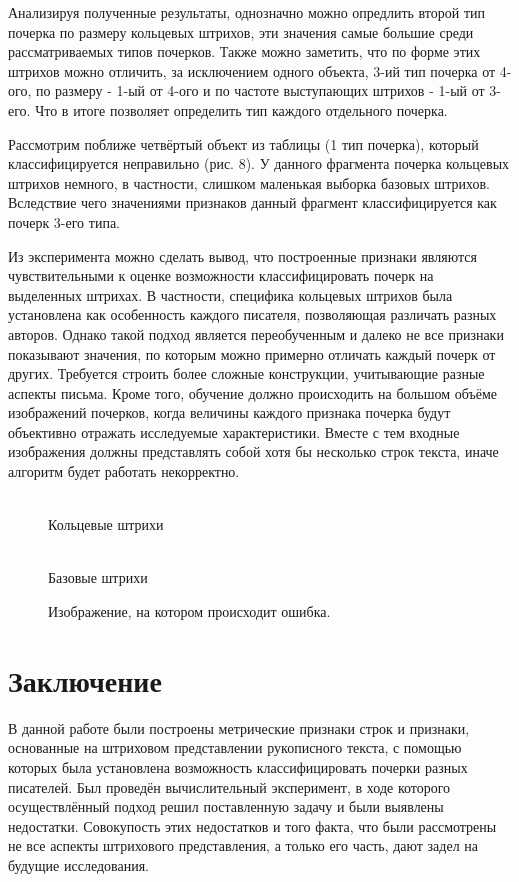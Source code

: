\documentclass{article}
\begin{document}
Анализируя полученные результаты, однозначно можно опредлить второй тип почерка по размеру кольцевых штрихов, эти значения самые большие среди рассматриваемых типов почерков. Также можно заметить, что по форме этих штрихов можно отличить, за исключением одного объекта, 3-ий тип почерка от 4-ого, по размеру - 1-ый от 4-ого и по частоте выступающих штрихов - 1-ый от 3-его. Что в итоге позволяет определить тип каждого отдельного почерка. 

Рассмотрим поближе четвёртый объект из таблицы (1 тип почерка), который классифицируется неправильно (рис. 8). У данного фрагмента почерка кольцевых штрихов немного, в частности, слишком маленькая выборка базовых штрихов. Вследствие чего значениями признаков данный фрагмент классифицируется как почерк 3-его типа.

Из эксперимента можно сделать вывод, что построенные признаки являются чувствительными к оценке возможности классифицировать почерк на выделенных штрихах. В частности, специфика кольцевых штрихов была установлена как особенность каждого писателя, позволяющая различать разных авторов. Однако такой подход является переобученным и далеко не все признаки показывают значения, по которым можно примерно отличать каждый почерк от других. Требуется строить более сложные конструкции, учитывающие разные аспекты письма. Кроме того, обучение должно происходить на большом объёме изображений почерков, когда величины каждого признака почерка будут объективно отражать исследуемые характеристики. Вместе с тем входные изображения должны представлять собой хотя бы несколько строк текста, иначе алгоритм будет работать некорректно.

\begin{figure}[h]
\begin{minipage}[h]{1\linewidth}
 \\ Кольцевые штрихи
\end{minipage}
\vfill
\begin{minipage}[h]{1\linewidth}
 \\ Базовые штрихи
\end{minipage}
\caption{Изображение, на котором происходит ошибка.}
\end{figure}

\section{Заключение}
В данной работе были построены метрические признаки строк и признаки, основанные на штриховом представлении рукописного текста, с помощью которых была установлена возможность классифицировать почерки разных писателей. Был проведён вычислительный эксперимент, в ходе которого осуществлённый подход решил поставленную задачу и были выявлены недостатки. Совокупость этих недостатков и того факта, что были рассмотрены не все аспекты штрихового представления, а только его часть, дают задел на будущие исследования.
\end{document}

